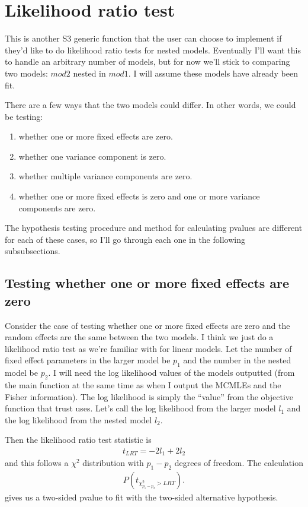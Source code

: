 \documentclass{article}
\begin{document}
\section{Likelihood ratio test}
This is another S3 generic function that the user can choose to implement if they'd  like  to do likelihood ratio tests for nested models. Eventually I'll want this to handle an arbitrary number of models, but for now we'll stick to comparing two models: $mod2$ nested in $mod1$.  I will assume these models have already been fit. 


 There are a few ways that the two models could differ. In other words, we could be testing:
 \begin{enumerate}
 \item whether one or more fixed effects are zero.
 \item whether one variance component is zero.
 \item whether multiple variance components are zero.
 \item whether one or more fixed effects is zero and one or more variance components are zero. 
\end{enumerate}
The hypothesis testing procedure and method for calculating pvalues are different for each of these cases, so I'll go through each one in the following subsubsections.

\subsection{Testing whether one or more fixed effects are zero}
Consider the  case of testing whether one or more fixed effects are zero and the random effects are the same between the two models. I think we just do a likelihood ratio test as we're familiar with for linear models.   Let the number of fixed effect parameters in the larger model be $p_1$  and the number in the nested model be $p_2$. I will need the log likelihood values of the models outputted (from the main function at the same time as when I output the MCMLEs and the Fisher information). The log likelihood is simply the ``value'' from the objective function that trust uses. Let's call the log likelihood from the larger model  $l_1$ and the log likelihood from the nested model  $l_2$. 

Then the likelihood ratio test statistic is
\begin{align}
t_{LRT}= -2l_1+2l_2
\end{align}
and this follows a $\chi^2$ distribution with $p_1-p_2$ degrees of freedom. The calculation
\begin{align}
P(t_{\chi^2_{p_1-p_2}>LRT} ).
\end{align}
gives us a two-sided pvalue to fit with the two-sided alternative hypothesis.
\end{document}
